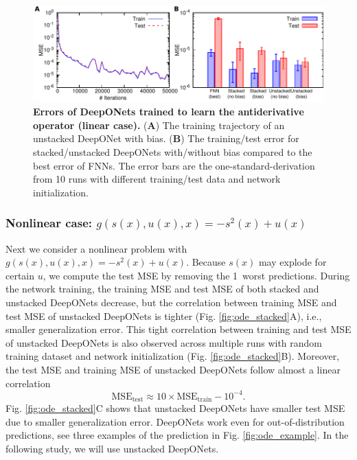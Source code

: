 \documentclass[11pt]{article}
\begin{document}
\begin{figure}[htbp]
\centering
\includegraphics{coefnet.pdf}
\caption{\textbf{Errors of DeepONets trained to learn the antiderivative operator (linear case).} (\textbf{A}) The training trajectory of an unstacked DeepONet with bias. (\textbf{B}) The training/test error for stacked/unstacked DeepONets with/without bias compared to the best error of FNNs. The error bars are the one-standard-derivation from 10 runs with different training/test data and network initialization.}
\label{fig:coefnet}
\end{figure}

\subsubsection{Nonlinear case: $g(s(x), u(x), x) = -s^2(x) + u(x)$}

Next we consider a nonlinear problem with $g(s(x), u(x), x) = -s^2(x) + u(x)$. Because $s(x)$ may explode for certain $u$, we compute the test MSE by removing the 1\textperthousand\ worst predictions. During the network training, the training MSE and test MSE of both stacked and unstacked DeepONets decrease, but the correlation between training MSE and test MSE of unstacked DeepONets is tighter (Fig. \ref{fig:ode_stacked}A), i.e., smaller generalization error. This tight correlation between training and test MSE of unstacked DeepONets is also observed across multiple runs with random training dataset and network initialization (Fig. \ref{fig:ode_stacked}B). Moreover, the test MSE and training MSE of unstacked DeepONets follow almost a linear correlation
$$\text{MSE}_{\text{test}} \approx 10 \times \text{MSE}_{\text{train}} - 10^{-4}.$$
Fig. \ref{fig:ode_stacked}C shows that unstacked DeepONets have smaller test MSE due to smaller generalization error. DeepONets work even for out-of-distribution predictions, see three examples of the prediction in Fig. \ref{fig:ode_example}. In the following study, we will use unstacked DeepONets.
\end{document}
